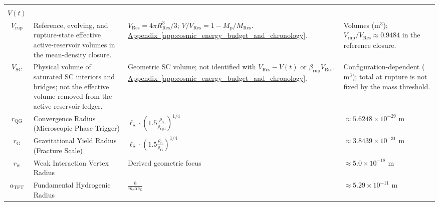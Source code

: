 \begin{longtable}{@{} c p{5.5cm} p{4cm} p{3.5cm} @{}}
\begin{tabular}[c]{@{}c@{}}$V_{\mathrm{Res}}$ \\ $V(t)$ \\ $V_{\mathrm{rup}}$\end{tabular} & {\raggedright Reference, evolving, and rupture-state effective active-reservoir volumes in the mean-density closure.\par} & {\raggedright $V_{\mathrm{Res}}=4\pi R_{\mathrm{Res}}^3/3$; $V/V_{\mathrm{Res}}=1-M_{\mathrm p}/M_{\mathrm{Res}}$. \newline \hyperref[app:cosmic_energy_budget_and_chronology]{Appendix~\ref*{app:cosmic_energy_budget_and_chronology}}.\par} & {\raggedright Volumes ($\mathrm{m^3}$); $V_{\mathrm{rup}}/V_{\mathrm{Res}}\approx0.9484$ in the reference closure.\par} \\

$V_{\mathrm{SC}}$ & {\raggedright Physical volume of saturated SC interiors and bridges; not the effective volume removed from the active-reservoir ledger.\par} & {\raggedright Geometric SC volume; not identified with $V_{\mathrm{Res}}-V(t)$ or $\beta_{\mathrm{rup}}V_{\mathrm{Res}}$. \newline \hyperref[app:cosmic_energy_budget_and_chronology]{Appendix~\ref*{app:cosmic_energy_budget_and_chronology}}.\par} & {\raggedright Configuration-dependent ($\mathrm{m^3}$); total at rupture is not fixed by the mass threshold.\par} \\


$r_{\mathrm{QG}}$ & Convergence Radius (Microscopic Phase Trigger) & $\ell_{\mathrm{S}} \cdot \left(1.5 \frac{\rho_{\mathrm{S}}}{\rho_{\mathrm{QG}}}\right)^{1/4}$ & $\approx 5.6248 \times 10^{-29} \text{ m}$ \\

$r_{\mathrm{G}}$ & Gravitational Yield Radius (Fracture Scale) & $\ell_{\mathrm{S}} \cdot \left(1.5 \frac{\rho_{\mathrm{S}}}{\rho_{\mathrm{G}}}\right)^{1/4}$ & $\approx 3.8439 \times 10^{-31} \text{ m}$ \\

$r_{\mathrm{w}}$ & Weak Interaction Vertex Radius & Derived geometric focus & $\approx 5.0 \times 10^{-18} \text{ m}$ \\

$a_{\mathrm{TFT}}$ & Fundamental Hydrogenic Radius & $\frac{\hbar}{m_{\mathrm{e}} \alpha c_{\mathrm{E}}}$ & $\approx 5.29 \times 10^{-11} \text{ m}$ \\


\end{longtable}
